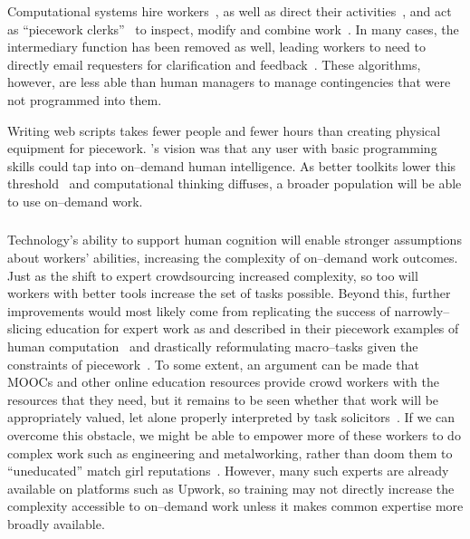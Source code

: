 \documentclass[trackingWork]{subfiles}
\begin{document}
Computational systems hire workers~\cite{turkitLittle,weld2010decision}, as well as direct their activities~\cite{uberAlgorithm}, and act as ``piecework clerks''~\cite{10.2307/23702539} to inspect, modify and combine work~\cite{turkopticon,takingAHITMcInnis}.
In many cases, the intermediary function has been removed as well, leading workers to need to directly email requesters for clarification and feedback~\cite{martin2014being}.
These algorithms, however, are less able than human managers to manage contingencies that were not programmed into them.


Writing web scripts takes fewer people and fewer hours than creating physical equipment for piecework.
\citeauthor{turkitLittle}'s vision was that any user with basic programming skills could tap into on--demand human intelligence.
As better toolkits lower this threshold~\cite{myers2000past} and computational thinking diffuses, a broader population will be able to use on--demand work.

\subsubsection{\implication}
Technology's ability to support human cognition will enable stronger assumptions about workers' abilities, increasing the complexity of on--demand work outcomes.
Just as the shift to expert crowdsourcing increased complexity, so too will workers with better tools increase the set of tasks possible.
Beyond this, further improvements would most likely come from replicating the success of narrowly--slicing education for expert work as \citeauthor{hart2013rise} and \citeauthor{grier2013computers} described in their piecework examples
of human computation~\cite{grier2013computers} and drastically reformulating macro--tasks given the constraints of piecework~\cite{hart2013rise}.
To some extent, an argument can be made that
MOOCs and other online education resources
provide crowd workers with the resources that they need, but 
it remains to be seen whether that work will be appropriately valued, let alone
properly interpreted by task solicitors~\cite{aguaded2013mooc}.
If we can overcome this obstacle,
we might be able to empower more of these workers to do complex work such as engineering and metalworking,
rather than doom them to ``uneducated'' match girl reputations~\cite{10.2307/3827491}.
However, many such experts are already available on platforms such as Upwork, so training may not directly increase the complexity accessible to on--demand work unless it makes common expertise more broadly available.
\end{document}
